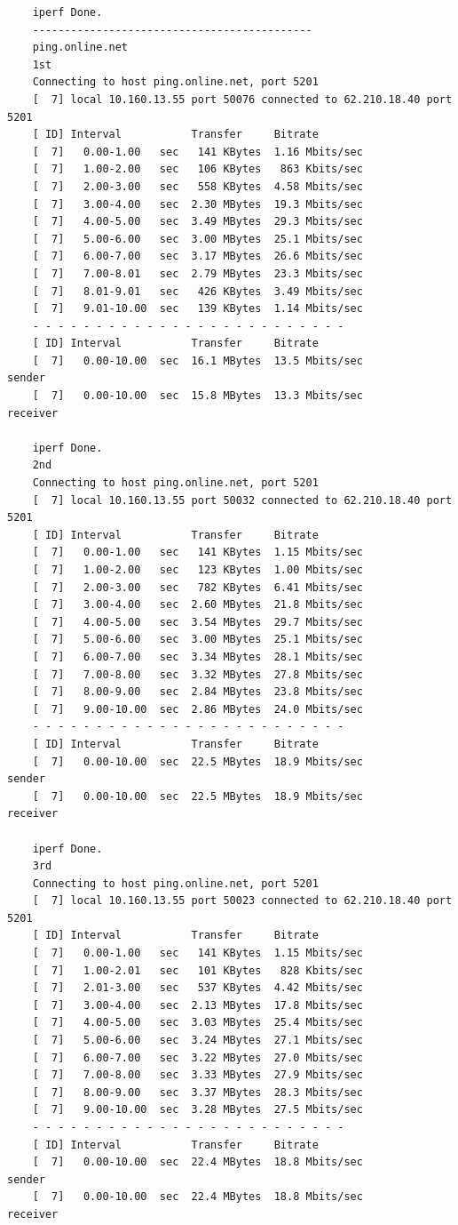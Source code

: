\documentclass[paper=a4, fontsize=10pt]{scrartcl} %
\numberwithin{equation}{section} %
\numberwithin{figure}{section} %
\numberwithin{table}{section} %
\begin{document}
\begin{lstlisting}
    iperf Done.
    --------------------------------------------
    ping.online.net
    1st
    Connecting to host ping.online.net, port 5201
    [  7] local 10.160.13.55 port 50076 connected to 62.210.18.40 port 5201
    [ ID] Interval           Transfer     Bitrate
    [  7]   0.00-1.00   sec   141 KBytes  1.16 Mbits/sec
    [  7]   1.00-2.00   sec   106 KBytes   863 Kbits/sec
    [  7]   2.00-3.00   sec   558 KBytes  4.58 Mbits/sec
    [  7]   3.00-4.00   sec  2.30 MBytes  19.3 Mbits/sec
    [  7]   4.00-5.00   sec  3.49 MBytes  29.3 Mbits/sec
    [  7]   5.00-6.00   sec  3.00 MBytes  25.1 Mbits/sec
    [  7]   6.00-7.00   sec  3.17 MBytes  26.6 Mbits/sec
    [  7]   7.00-8.01   sec  2.79 MBytes  23.3 Mbits/sec
    [  7]   8.01-9.01   sec   426 KBytes  3.49 Mbits/sec
    [  7]   9.01-10.00  sec   139 KBytes  1.14 Mbits/sec
    - - - - - - - - - - - - - - - - - - - - - - - - -
    [ ID] Interval           Transfer     Bitrate
    [  7]   0.00-10.00  sec  16.1 MBytes  13.5 Mbits/sec                  sender
    [  7]   0.00-10.00  sec  15.8 MBytes  13.3 Mbits/sec                  receiver
    
    iperf Done.
    2nd
    Connecting to host ping.online.net, port 5201
    [  7] local 10.160.13.55 port 50032 connected to 62.210.18.40 port 5201
    [ ID] Interval           Transfer     Bitrate
    [  7]   0.00-1.00   sec   141 KBytes  1.15 Mbits/sec
    [  7]   1.00-2.00   sec   123 KBytes  1.00 Mbits/sec
    [  7]   2.00-3.00   sec   782 KBytes  6.41 Mbits/sec
    [  7]   3.00-4.00   sec  2.60 MBytes  21.8 Mbits/sec
    [  7]   4.00-5.00   sec  3.54 MBytes  29.7 Mbits/sec
    [  7]   5.00-6.00   sec  3.00 MBytes  25.1 Mbits/sec
    [  7]   6.00-7.00   sec  3.34 MBytes  28.1 Mbits/sec
    [  7]   7.00-8.00   sec  3.32 MBytes  27.8 Mbits/sec
    [  7]   8.00-9.00   sec  2.84 MBytes  23.8 Mbits/sec
    [  7]   9.00-10.00  sec  2.86 MBytes  24.0 Mbits/sec
    - - - - - - - - - - - - - - - - - - - - - - - - -
    [ ID] Interval           Transfer     Bitrate
    [  7]   0.00-10.00  sec  22.5 MBytes  18.9 Mbits/sec                  sender
    [  7]   0.00-10.00  sec  22.5 MBytes  18.9 Mbits/sec                  receiver
    
    iperf Done.
    3rd
    Connecting to host ping.online.net, port 5201
    [  7] local 10.160.13.55 port 50023 connected to 62.210.18.40 port 5201
    [ ID] Interval           Transfer     Bitrate
    [  7]   0.00-1.00   sec   141 KBytes  1.15 Mbits/sec
    [  7]   1.00-2.01   sec   101 KBytes   828 Kbits/sec
    [  7]   2.01-3.00   sec   537 KBytes  4.42 Mbits/sec
    [  7]   3.00-4.00   sec  2.13 MBytes  17.8 Mbits/sec
    [  7]   4.00-5.00   sec  3.03 MBytes  25.4 Mbits/sec
    [  7]   5.00-6.00   sec  3.24 MBytes  27.1 Mbits/sec
    [  7]   6.00-7.00   sec  3.22 MBytes  27.0 Mbits/sec
    [  7]   7.00-8.00   sec  3.33 MBytes  27.9 Mbits/sec
    [  7]   8.00-9.00   sec  3.37 MBytes  28.3 Mbits/sec
    [  7]   9.00-10.00  sec  3.28 MBytes  27.5 Mbits/sec
    - - - - - - - - - - - - - - - - - - - - - - - - -
    [ ID] Interval           Transfer     Bitrate
    [  7]   0.00-10.00  sec  22.4 MBytes  18.8 Mbits/sec                  sender
    [  7]   0.00-10.00  sec  22.4 MBytes  18.8 Mbits/sec                  receiver
    

\end{lstlisting}
\end{document}
